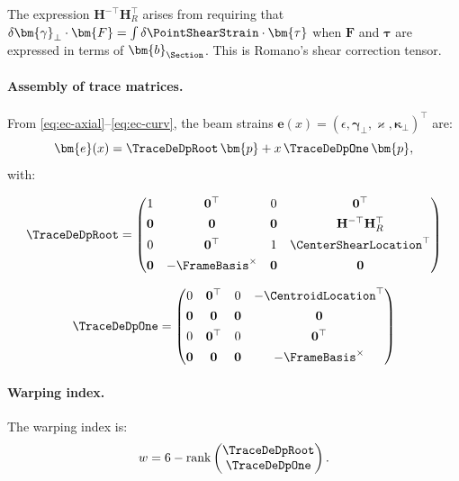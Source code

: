\begin{remark}
The expression $\mathbf{H}^{-\top}\mathbf{H}_R^\top$ arises from requiring that 
$\delta\bm{\gamma}_\perp \cdot \bm{F} = \int \delta\PointShearStrain \cdot \bm{\tau}$ 
when $\bm{F}$ and $\bm{\tau}$ are expressed in terms of $\bm{b}_{\Section}$. This is 
Romano's shear correction tensor.
\end{remark}

\paragraph{Assembly of trace matrices.}

From \eqref{eq:ec-axial}--\eqref{eq:ec-curv}, the beam strains 
$\bm{e}(x) = (\epsilon, \bm{\gamma}_\perp, \varkappa, \bm{\kappa}_\perp)^\top$ are:
\begin{equation}
\bm{e}(x) = \TraceDeDpRoot\,\bm{p} + x\,\TraceDeDpOne\,\bm{p},
\end{equation}
with:

\begin{equation}
\TraceDeDpRoot = \begin{pmatrix}
1 & \mathbf{0}^\top & 0 & \mathbf{0}^\top \\[4pt]
\mathbf{0} & \mathbf{0} & \mathbf{0} & \mathbf{H}^{-\top}\mathbf{H}_R^\top \\[4pt]
0 & \mathbf{0}^\top & 1 & \CenterShearLocation^\top \\[4pt]
\mathbf{0} & -\FrameBasis^\times & \mathbf{0} & \mathbf{0}
\end{pmatrix}
\label{eq:T0-romano}
\end{equation}

\begin{equation}
\TraceDeDpOne = \begin{pmatrix}
0 & \mathbf{0}^\top & 0 & -\CentroidLocation^\top \\[4pt]
\mathbf{0} & \mathbf{0} & \mathbf{0} & \mathbf{0} \\[4pt]
0 & \mathbf{0}^\top & 0 & \mathbf{0}^\top \\[4pt]
\mathbf{0} & \mathbf{0} & \mathbf{0} & -\FrameBasis^\times
\end{pmatrix}
\label{eq:T1-romano}
\end{equation}

\paragraph{Warping index.}

The warping index is:
\begin{equation}
w = 6 - \mathrm{rank}\begin{pmatrix} \TraceDeDpRoot \\ \TraceDeDpOne \end{pmatrix}.
\end{equation}

